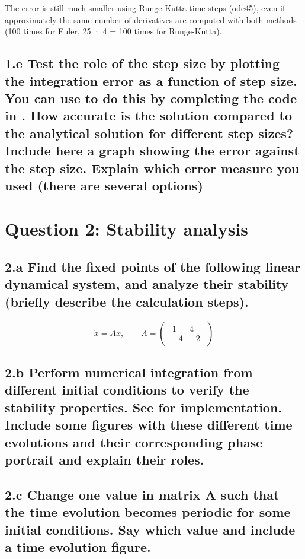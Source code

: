 \documentclass{cmc}
\begin{document}
The error is still much smaller using Runge-Kutta time steps (ode45), even if approximately the same number of derivatives are computed with both methods (100 times for Euler, 25 · 4 = 100 times for Runge-Kutta).

\clearpage

\subsection*{1.e Test the role of the step size by plotting the integration
  error as a function of step size. You can use
  to do this by completing the code in
  . %
  How accurate is the solution compared to the analytical solution for different
  step sizes?  Include here a graph showing the error against the step
  size. Explain which error measure you used (there are several options)}



\vspace{0.3\textheight}



\clearpage

\section*{Question 2: Stability analysis}

\subsection*{2.a Find the fixed points of the following linear dynamical system,
  and analyze their stability (briefly describe the calculation steps).}

\begin{equation}
  \label{eq:system}
  \dot{x} = A x,
  \qquad
  A =
  \begin{pmatrix}
    \begin{array}{rr}
      1 & 4 \\
      -4 & -2
    \end{array}
  \end{pmatrix}
\end{equation}



\vspace{0.3\textheight}



\clearpage

\subsection*{2.b Perform numerical integration from different initial conditions
  to verify the stability properties. See 
  for implementation. Include some figures with these different time evolutions
  and their corresponding phase portrait and explain their roles.}


\clearpage

\subsection*{2.c Change one value in matrix A such that the time evolution
  becomes periodic for some initial conditions. Say which value and include a
  time evolution figure.}



\vspace{0.3\textheight}
\end{document}
